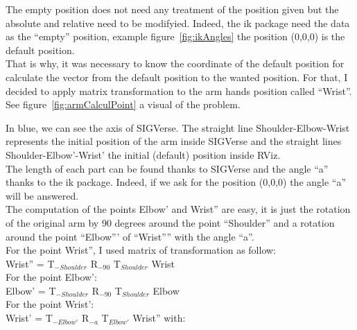 The empty position does not need any treatment of the position given but the absolute and relative need to be modifyied. Indeed, the ik package need the data as the ``empty'' position, example figure~\ref{fig:ikAngles} the position (0,0,0) is the default position.\\
That is why, it was necessary to know the coordinate of the default position for calculate the vector from the default position to the wanted position. For that, I decided to apply matrix transformation to the arm hands position called ``Wrist''. See figure~\ref{fig:armCalculPoint} a visual of the problem.

\noindent\begin{minipage}{\linewidth}%
\label{fig:armCalculPoint}%
\end{minipage}

In blue, we can see the axis of SIGVerse. The straight line Shoulder-Elbow-Wrist represents the initial position of the arm inside SIGVerse and the straight lines Shoulder-Elbow'-Wrist' the initial (default) position inside RViz.\\

The length of each part can be found thanks to SIGVerse and the angle ``a'' thanks to the ik package. Indeed, if we ask for the position (0,0,0) the angle ``a'' will be answered.\\
The computation of the points Elbow' and Wrist'' are easy, it is just the rotation of the original arm by 90 degrees around the point ``Shoulder'' and a rotation around the point ``Elbow''' of ``Wrist'''' with the angle ``a''.\\
For the point Wrist'', I used matrix of transformation as follow:\\
Wrist'' = T$_{-Shoulder}$ R$_{-90}$ T$_{Shoulder}$ Wrist\\
For the point Elbow':\\
Elbow' = T$_{-Shoulder}$ R$_{-90}$ T$_{Shoulder}$ Elbow\\
For the point Wrist':\\
Wrist' = T$_{-Elbow'}$ R$_{-a}$ T$_{Elbow'}$ Wrist'' with:\\

